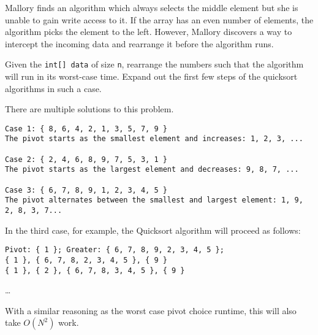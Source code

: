 \begin{blocksection}
\question Mallory finds an algorithm which always selects the middle element
but she is unable to gain write access to it. If the array has an even number
of elements, the algorithm picks the element to the left. However, Mallory
discovers a way to intercept the incoming data and rearrange it before the
algorithm runs.

Given the \lstinline$int[] data$ of size \lstinline$n$, rearrange the numbers
such that the algorithm will run in its worst-case time. Expand out the first
few steps of the quicksort algorithms in such a case.

\begin{solution}[1in]
There are multiple solutions to this problem.
\begin{verbatim}
Case 1: { 8, 6, 4, 2, 1, 3, 5, 7, 9 }
The pivot starts as the smallest element and increases: 1, 2, 3, ...

Case 2: { 2, 4, 6, 8, 9, 7, 5, 3, 1 }
The pivot starts as the largest element and decreases: 9, 8, 7, ...

Case 3: { 6, 7, 8, 9, 1, 2, 3, 4, 5 }
The pivot alternates between the smallest and largest element: 1, 9, 2, 8, 3, 7... 
\end{verbatim}

In the third case, for example, the Quicksort algorithm will proceed as follows:

\begin{verbatim}
Pivot: { 1 }; Greater: { 6, 7, 8, 9, 2, 3, 4, 5 }; 
{ 1 }, { 6, 7, 8, 2, 3, 4, 5 }, { 9 }
{ 1 }, { 2 }, { 6, 7, 8, 3, 4, 5 }, { 9 }
\end{verbatim}
\ldots

With a similar reasoning as the worst case pivot choice runtime, this will also take $O(N^2)$
work.

\end{solution}
\end{blocksection}
